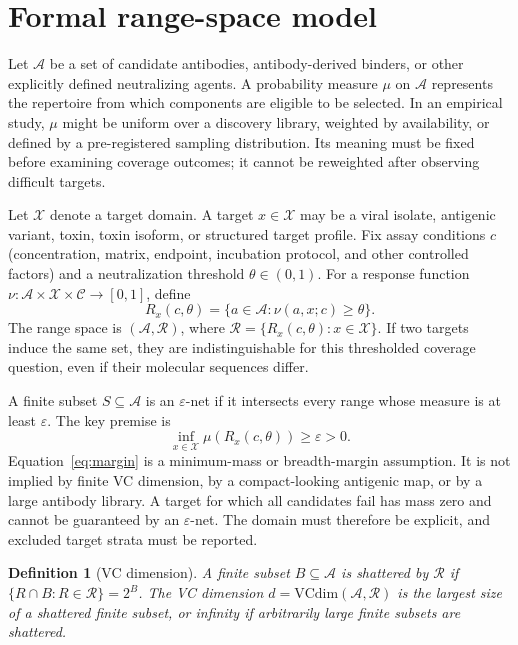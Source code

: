 \documentclass[11pt,a4paper]{article}
\newtheorem{definition}[theorem]{Definition}\theoremstyle{remark}
\newcommand{\Acal}{\mathcal A}
\newcommand{\Xcal}{\mathcal X}
\newcommand{\Rcal}{\mathcal R}
\newcommand{\eps}{\varepsilon}
\newcommand{\VC}{\mathrm{VCdim}}
\begin{document}
\section{Formal range-space model}
Let $\Acal$ be a set of candidate antibodies, antibody-derived binders, or other explicitly defined neutralizing agents. A probability measure $\mu$ on $\Acal$ represents the repertoire from which components are eligible to be selected. In an empirical study, $\mu$ might be uniform over a discovery library, weighted by availability, or defined by a pre-registered sampling distribution. Its meaning must be fixed before examining coverage outcomes; it cannot be reweighted after observing difficult targets.

Let $\Xcal$ denote a target domain. A target $x\in\Xcal$ may be a viral isolate, antigenic variant, toxin, toxin isoform, or structured target profile. Fix assay conditions $c$ (concentration, matrix, endpoint, incubation protocol, and other controlled factors) and a neutralization threshold $\theta\in(0,1)$. For a response function $\nu:\Acal\times\Xcal\times\mathcal C\to[0,1]$, define
\begin{equation}R_x(c,\theta)=\{a\in\Acal:\nu(a,x;c)\geq\theta\}.\label{eq:range}\end{equation}
The range space is $(\Acal,\Rcal)$, where $\Rcal=\{R_x(c,\theta):x\in\Xcal\}$. If two targets induce the same set, they are indistinguishable for this thresholded coverage question, even if their molecular sequences differ.

A finite subset $S\subseteq\Acal$ is an $\eps$-net if it intersects every range whose measure is at least $\eps$. The key premise is
\begin{equation}\inf_{x\in\Xcal}\mu(R_x(c,\theta))\geq\eps>0.\label{eq:margin}\end{equation}
Equation~\eqref{eq:margin} is a minimum-mass or breadth-margin assumption. It is not implied by finite VC dimension, by a compact-looking antigenic map, or by a large antibody library. A target for which all candidates fail has mass zero and cannot be guaranteed by an $\eps$-net. The domain must therefore be explicit, and excluded target strata must be reported.

\begin{definition}[VC dimension] A finite subset $B\subseteq\Acal$ is shattered by $\Rcal$ if $\{R\cap B:R\in\Rcal\}=2^B$. The VC dimension $d=\VC(\Acal,\Rcal)$ is the largest size of a shattered finite subset, or infinity if arbitrarily large finite subsets are shattered.\end{definition}
\end{document}
